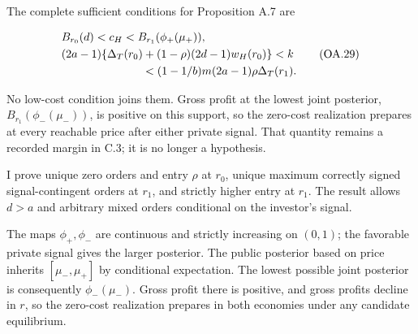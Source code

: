 
The complete sufficient conditions for Proposition A.7 are

\[
\begin{aligned}
&B_{r_0}(d)<c_H<B_{r_1}(\phi_+(\mu_+)),\\
&(2a-1)\{\Delta_T(r_0)+(1-\rho)(2d-1)w_H(r_0)\}<k\\
&\hspace{25mm}<(1-1/b)m(2a-1)\rho\Delta_T(r_1).
\end{aligned}
\tag{OA.29}\label{eq:oa-oa-29}
\]

No low-cost condition joins them. Gross profit at the lowest joint posterior,
\(B_{r_1}(\phi_-(\mu_-))\), is positive on this support, so the zero-cost
realization prepares at every reachable price after either private signal.
That quantity remains a recorded margin in C.3; it is no longer a hypothesis.

I prove unique zero orders and entry \(\rho\) at \(r_0\), unique maximum
correctly signed signal-contingent orders at \(r_1\), and strictly
higher entry at \(r_1\). The result allows \(d>a\) and arbitrary mixed
orders conditional on the investor's signal.

The maps \(\phi_+,\phi_-\) are continuous and strictly increasing on
\((0,1)\); the favorable private signal gives the larger posterior. The
public posterior based on price inherits \([\mu_-,\mu_+]\) by
conditional expectation. The lowest possible joint posterior is
consequently \(\phi_-(\mu_-)\). Gross profit there is positive, and
gross profits decline in \(r\), so the zero-cost realization prepares
in both economies under any candidate equilibrium.
